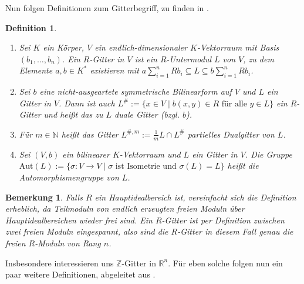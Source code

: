 \documentclass[12pt,a4paper,halfparskip,headsepline,bibtotocnumbered]{scrreprt}
\theoremstyle{nummermitklammern}
\newtheorem{definition}[defsatzusw]{Definition}
\newtheorem{bemerkung}[defsatzusw]{Bemerkung}
\theoremstyle{nonumberbreak}
\newcommand{\N}{\mathbb{N}}
\newcommand{\Z}{\mathbb{Z}}
\newcommand{\R}{\mathbb{R}}
\begin{document}
Nun folgen Definitionen zum Gitterbegriff, zu finden in \cite[Def. (14.1), (14.2)]{kneser}.
\begin{framed}
	\begin{definition}
		\begin{enumerate}[label=(\roman*)]
			\item Sei $K$ ein Körper, $V$ ein endlich-dimensionaler $K$-Vektorraum mit Basis $(b_1,\dots,b_n)$. Ein $R$-Gitter in $V$ ist ein $R$-Untermodul $L$ von $V$, zu dem Elemente $a,b \in K^*$ existieren mit $a \sum_{i=1}^n R b_i \subseteq L \subseteq b \sum_{i=1}^n R b_i$.
			\item Sei $b$ eine nicht-ausgeartete symmetrische Bilinearform auf $V$ und $L$ ein Gitter in $V$. Dann ist auch $L^\# := \lbrace x \in V \mid b(x,y) \in R \text{ für alle } y \in L \rbrace$ ein $R$-Gitter und heißt \textit{das zu $L$ duale Gitter} (bzgl. $b$).
			\item Für $m \in \N$ heißt das Gitter $L^{\#,m} := \frac{1}{m}L \cap L^\#$ \textit{partielles Dualgitter} von $L$.
			\item Sei $(V,b)$ ein bilinearer $K$-Vektorraum und $L$ ein Gitter in $V$. Die Gruppe $\text{Aut}(L) := \lbrace \sigma : V \rightarrow V \mid \sigma \text{ ist Isometrie und } \sigma(L) = L \rbrace$ heißt die \textit{Automorphismengruppe} von $L$.
		\end{enumerate}
	\end{definition}
\end{framed}

\begin{bemerkung}
	Falls $R$ ein Hauptidealbereich ist, vereinfacht sich die Definition erheblich, da Teilmoduln von endlich erzeugten freien Moduln über Hauptidealbereichen wieder frei sind. Ein $R$-Gitter ist per Definition zwischen zwei freien Moduln eingespannt, also sind die $R$-Gitter in diesem Fall genau die freien $R$-Moduln von Rang $n$.
\end{bemerkung}

Insbesondere interessieren uns $\Z$-Gitter in $\R^n$. Für eben solche folgen nun ein paar weitere Definitionen, abgeleitet aus \cite[Def. (1.7), (1.13), (14.7), (26.1)]{kneser}.
\end{document}
